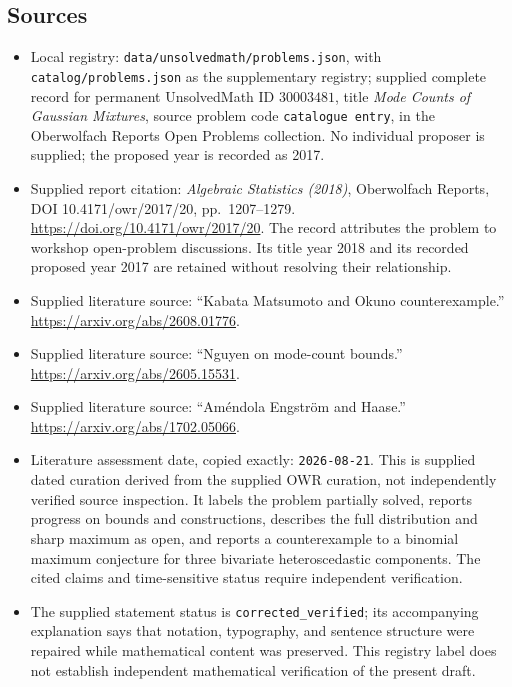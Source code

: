 \documentclass[11pt]{article}
\begin{document}
\subsection{Sources}
\begin{itemize}
\item Local registry: \texttt{data/unsolvedmath/problems.json}, with \texttt{catalog/problems.json} as the supplementary registry; supplied complete record for permanent UnsolvedMath ID \(30003481\), title \emph{Mode Counts of Gaussian Mixtures}, source problem code \texttt{catalogue entry}, in the Oberwolfach Reports Open Problems collection. No individual proposer is supplied; the proposed year is recorded as 2017.
\item Supplied report citation: \emph{Algebraic Statistics (2018)}, Oberwolfach Reports, DOI 10.4171/owr/2017/20, pp.\ 1207--1279. \url{https://doi.org/10.4171/owr/2017/20}. The record attributes the problem to workshop open-problem discussions. Its title year 2018 and its recorded proposed year 2017 are retained without resolving their relationship.
\item Supplied literature source: ``Kabata Matsumoto and Okuno counterexample.'' \url{https://arxiv.org/abs/2608.01776}.
\item Supplied literature source: ``Nguyen on mode-count bounds.'' \url{https://arxiv.org/abs/2605.15531}.
\item Supplied literature source: ``Améndola Engström and Haase.'' \url{https://arxiv.org/abs/1702.05066}.
\item Literature assessment date, copied exactly: \texttt{2026-08-21}. This is supplied dated curation derived from the supplied OWR curation, not independently verified source inspection. It labels the problem partially solved, reports progress on bounds and constructions, describes the full distribution and sharp maximum as open, and reports a counterexample to a binomial maximum conjecture for three bivariate heteroscedastic components. The cited claims and time-sensitive status require independent verification.
\item The supplied statement status is \texttt{corrected\_verified}; its accompanying explanation says that notation, typography, and sentence structure were repaired while mathematical content was preserved. This registry label does not establish independent mathematical verification of the present draft.
\end{itemize}
\end{document}
